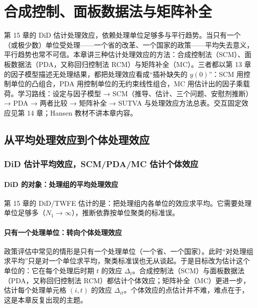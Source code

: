 \chapter{合成控制、面板数据法与矩阵补全}
\label{ch:U16-scm}
\providecommand{\UXVIlabel}[1]{\expandafter\def\csname @currentlabel\endcsname{\thetcbcounter}\label{#1}}

第 15 章的 DiD 估计处理效应，依赖处理单位足够多与平行趋势。当只有一个（或极少数）单位受处理——一个省的改革、一个国家的政策——平均失去意义，平行趋势也常不可信。本章讲三种估计处理效应的方法：合成控制法（SCM）、面板数据法（PDA，又称回归控制法 RCM）与矩阵补全（MC）。三者都以第 13 章的因子模型描述无处理结果，都把处理效应看成“插补缺失的 $y(0)$”：SCM 用控制单位的凸组合，PDA 用控制单位的无约束线性组合，MC 用估计出的因子乘载荷。学习路线：设定与因子模型 → SCM（推导、估计、三个问题、安慰剂推断）→ PDA → 两者比较 → 矩阵补全 → SUTVA 与处理效应方法总表。交互固定效应见第 14 章；Hansen 教材不讲本章内容。

\section{从平均处理效应到个体处理效应}\label{sec:U16-ite}

\subsection{DiD 估计平均效应，SCM/PDA/MC 估计个体效应}

\subsubsection{DiD 的对象：处理组的平均处理效应}

第 15 章的 DiD/TWFE 估计的是：把处理组内各单位的效应求平均。它需要处理单位足够多（$N_1\to\infty$），推断依靠按单位聚类的标准误。

\subsubsection{只有一个处理单位：转向个体处理效应}

政策评估中常见的情形是只有一个处理单位（一个省、一个国家）。此时“对处理组求平均”只是对一个单位求平均，聚类标准误也无从谈起。于是目标改为估计这个单位的：它在每个处理后时期 $t$ 的效应 $\Delta_t$。合成控制法（SCM）与面板数据法（PDA，又称回归控制法 RCM）都估计个体效应；矩阵补全（MC）更进一步，估计每个处理单元格 $(i,t)$ 的效应 $\Delta_{it}$。个体效应的点估计并不难，难点在于，这是本章反复出现的主题。

